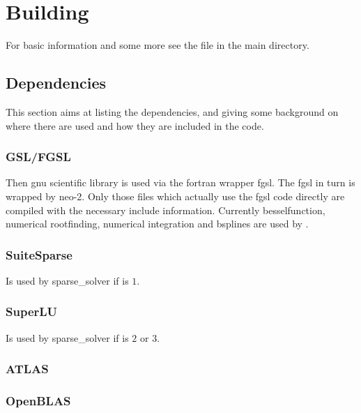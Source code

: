 \chapter{Building}
For basic information and some more see the file  in the
\neotwo main directory.

\section{Dependencies}
This section aims at listing the dependencies, and giving some
background on where there are used and how they are included in the
code.

\subsection{GSL/FGSL}
Then gnu scientific library is used via the fortran wrapper fgsl. The
fgsl in turn is wrapped by neo-2. Only those files which actually use
the fgsl code directly are compiled with the necessary include
information.
Currently besselfunction, numerical rootfinding, numerical integration
and bsplines are used by \neotwo.

\subsection{SuiteSparse}
Is used by sparse\_solver if  is $1$.

\subsection{SuperLU}
Is used by sparse\_solver if  is
$2$ or $3$.

\subsection{ATLAS}

\subsection{OpenBLAS}

